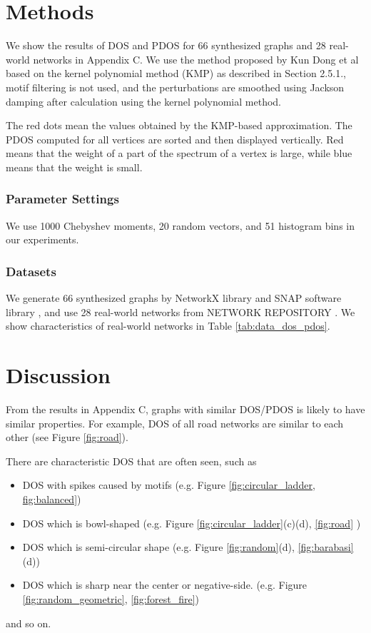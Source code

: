 \documentclass[senior,final,11pt]{iscs-thesis}
\begin{document}
\section{Methods}
We show the results of DOS and PDOS for 66 synthesized graphs and 28 real-world networks in Appendix C. We use the method proposed by Kun Dong et al \cite{dong2019network} based on the kernel polynomial method (KMP) as described in Section 2.5.1., motif filtering is not used, and the perturbations are smoothed using Jackson damping after calculation using the kernel polynomial method.

The red dots mean the values obtained by the KMP-based approximation. The PDOS computed for all vertices are sorted and then displayed vertically. Red means that the weight of a part of the spectrum of a vertex is large, while blue means that the weight is small.

\subsubsection*{Parameter Settings}
We use 1000 Chebyshev moments, 20 random vectors, and 51 histogram bins in our experiments.

\subsubsection*{Datasets}
We generate 66 synthesized graphs by NetworkX library \cite{SciPyProceedings_11} and SNAP software library \cite{leskovec2016snap}, and use 28 real-world networks from NETWORK REPOSITORY \cite{nr}. We show characteristics of real-world networks in Table \ref{tab:data_dos_pdos}.


\section{Discussion}

From the results in Appendix C, graphs with similar DOS/PDOS is likely to have similar properties. For example, DOS of all road networks are similar to each other (see Figure \ref{fig:road}).

There are characteristic DOS that are often seen, such as
\begin{itemize}
  \item DOS with spikes caused by motifs (e.g. Figure \ref{fig:circular_ladder, fig:balanced})
  \item DOS which is bowl-shaped (e.g. Figure \ref{fig:circular_ladder}(c)(d), \ref{fig:road} )
  \item DOS which is semi-circular shape (e.g. Figure \ref{fig:random}(d), \ref{fig:barabasi}(d))
  \item DOS which is sharp near the center or negative-side. (e.g. Figure \ref{fig:random_geometric}, \ref{fig:forest_fire})
\end{itemize}
and so on.
\end{document}
